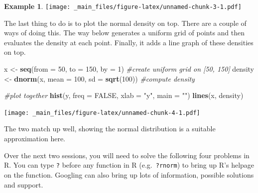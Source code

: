 \documentclass[
]{book}
\newenvironment{Shaded}{\begin{snugshade}}{\end{snugshade}}
\newcommand{\AttributeTok}[1]{\textcolor[rgb]{0.13,0.29,0.53}{#1}}
\newcommand{\CommentTok}[1]{\textcolor[rgb]{0.56,0.35,0.01}{\textit{#1}}}
\newcommand{\ConstantTok}[1]{\textcolor[rgb]{0.56,0.35,0.01}{#1}}
\newcommand{\DecValTok}[1]{\textcolor[rgb]{0.00,0.00,0.81}{#1}}
\newcommand{\FunctionTok}[1]{\textcolor[rgb]{0.13,0.29,0.53}{\textbf{#1}}}
\newcommand{\NormalTok}[1]{#1}
\newcommand{\OtherTok}[1]{\textcolor[rgb]{0.56,0.35,0.01}{#1}}
\newcommand{\StringTok}[1]{\textcolor[rgb]{0.31,0.60,0.02}{#1}}
\theoremstyle{definition}
\theoremstyle{definition}
\newtheorem{example}{Example}[chapter]
\theoremstyle{definition}
\theoremstyle{definition}
\theoremstyle{remark}
\begin{document}
\begin{example}
\texttt{[image: \_main\_files/figure-latex/unnamed-chunk-3-1.pdf]}

The last thing to do is to plot the normal density on top. There are a couple of ways of doing this. The way below generates a uniform grid of points and then evaluates the density at each point. Finally, it adds a line graph of these densities on top.

\begin{Shaded}
\begin{Highlighting}[]
\NormalTok{x }\OtherTok{\textless{}{-}} \FunctionTok{seq}\NormalTok{(}\AttributeTok{from =} \DecValTok{50}\NormalTok{, }\AttributeTok{to =} \DecValTok{150}\NormalTok{, }\AttributeTok{by =} \DecValTok{1}\NormalTok{)           }\CommentTok{\#create uniform grid on [50, 150]}
\NormalTok{density }\OtherTok{\textless{}{-}} \FunctionTok{dnorm}\NormalTok{(x, }\AttributeTok{mean =} \DecValTok{100}\NormalTok{, }\AttributeTok{sd =} \FunctionTok{sqrt}\NormalTok{(}\DecValTok{100}\NormalTok{)) }\CommentTok{\#compute density}

\CommentTok{\#plot together}
\FunctionTok{hist}\NormalTok{(y, }\AttributeTok{freq =} \ConstantTok{FALSE}\NormalTok{, }\AttributeTok{xlab =} \StringTok{"y"}\NormalTok{, }\AttributeTok{main =} \StringTok{""}\NormalTok{)}
\FunctionTok{lines}\NormalTok{(x, density)}
\end{Highlighting}
\end{Shaded}

\texttt{[image: \_main\_files/figure-latex/unnamed-chunk-4-1.pdf]}

The two match up well, showing the normal distribution is a suitable approximation here.
\end{example}

Over the next two sessions, you will need to solve the following four problems in R. You can type \texttt{?} before any function in R (e.g.~\texttt{?rnorm}) to bring up R's helpage on the function. Googling can also bring up lots of information, possible solutions and support.
\end{document}

